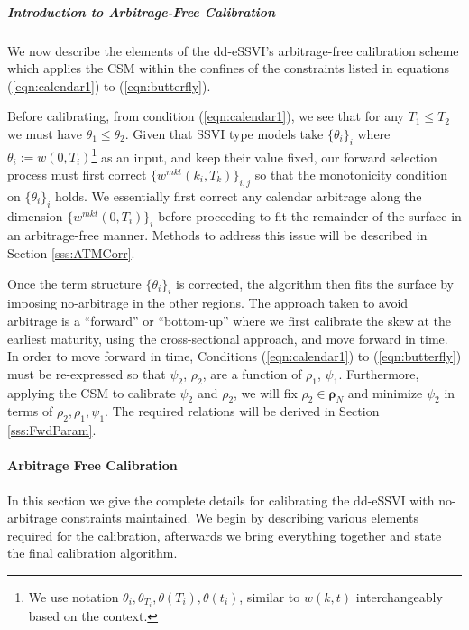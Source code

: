 \documentclass[11pt,letterpaper]{article}
\begin{document}
\subparagraph{Introduction to Arbitrage-Free Calibration} We now describe the elements of the dd-eSSVI's arbitrage-free calibration scheme which applies the CSM within the confines of the constraints listed in equations (\ref{eqn:calendar1}) to (\ref{eqn:butterfly}). 

Before calibrating, from condition (\ref{eqn:calendar1}), we see that for any $T_1 \leq T_2$ we must have $\theta_{1} \leq \theta_{2}$. Given that SSVI type models take $\{\theta_{i}\}_{i}$ where $\theta_{i} := w(0,T_i)$\footnote{We use notation $\theta_i, \theta_{T_i}, \theta(T_i), \theta(t_i)$, similar to $w(k,t)$ interchangeably based on the context. } as an input, and keep their value fixed, our forward selection process must first correct $\{w^{mkt}(k_i,T_k)\}_{i,j}$ so that the monotonicity condition on $\{\theta_{i}\}_i$ holds. We essentially first correct any calendar arbitrage along the dimension $\{w^{mkt}(0,T_i)\}_{i}$ before proceeding to fit the remainder of the surface in an arbitrage-free manner. Methods to address this issue will be described in Section \ref{sss:ATMCorr}. 

Once the term structure $\{ \theta_{i} \}_i$ is corrected, the algorithm then fits the surface by imposing no-arbitrage in the other regions. The approach taken to avoid arbitrage is a ``forward'' or ``bottom-up'' where we first calibrate the skew at the earliest maturity, using the cross-sectional approach, and move forward in time. In order to move forward in time, Conditions (\ref{eqn:calendar1}) to (\ref{eqn:butterfly}) must be re-expressed so that $\psi_{2}$, $\rho_{2}$, are a function of $\rho_{1}$, $\psi_{1}$. Furthermore, applying the CSM to calibrate $\psi_2$ and $\rho_2$, we will fix $\rho_2 \in \pmb{\rho}_N $ and minimize $\psi_2$ in terms of $\rho_2, \rho_1, \psi_1$. The required relations will be derived in Section \ref{sss:FwdParam}. 


\paragraph{Arbitrage Free Calibration}

In this section we give the complete details for calibrating the dd-eSSVI with no-arbitrage constraints maintained. We begin by describing various elements required for the calibration, afterwards we bring everything together and state the final calibration algorithm. 
\end{document}
